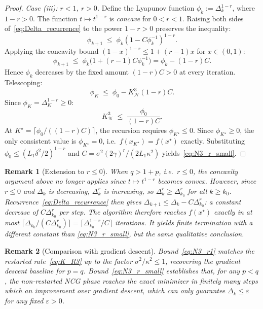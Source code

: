 \documentclass{article}
\newtheorem{remark}{Remark}
\begin{document}
\begin{proof}
\medskip
\noindent\textit{Case (iii): $r<1$, $r > 0$.}
Define the Lyapunov function $\phi_k:=\Delta_k^{1-r}$, where
$1-r>0$. The function $t\mapsto t^{1-r}$ is \emph{concave} for
$0<r<1$. Raising both sides of~\eqref{eq:Delta_recurrence} to the
power $1-r>0$ preserves the inequality:
\[
\phi_{k+1} \;\leq\; \phi_k(1-C\phi_k^{-1})^{1-r}.
\]
Applying the concavity bound $(1-x)^{1-r}\leq 1+(r-1)x$ for
$x\in(0,1)$:
\[
\phi_{k+1} \;\leq\; \phi_k\bigl(1+(r-1)C\phi_k^{-1}\bigr)
= \phi_k - (1-r)C.
\]
Hence $\phi_k$ decreases by the fixed amount $(1-r)C>0$ at every
iteration. Telescoping:
\[
\phi_K \;\leq\; \phi_0 - K^3_{\mathcal{N}}(1-r)C.
\]
Since $\phi_K=\Delta_K^{1-r}\geq 0$:
\[
K^3_{\mathcal{N}} \;\leq\; \frac{\phi_0}{(1-r)C}.
\]
At $K^\star=\lceil\phi_0/((1-r)C)\rceil$, the recursion requires
$\phi_{K^\star}\leq 0$. Since $\phi_{K^\star}\geq 0$, the only
consistent value is $\phi_{K^\star}=0$, i.e.\
$f(x_{K^\star})=f(x^\star)$ exactly.
Substituting $\phi_0\leq(L_1\delta^2/2)^{1-r}$ and
$C=\sigma^2(2\gamma)^r/(2L_1\kappa^2)$
yields~\eqref{eq:N3_r_small}.
\end{proof}

\begin{remark}[Extension to $r\leq 0$]
\label{rem:r_negative}
When $q>1+p$, i.e.\ $r\leq 0$, the concavity argument above no
longer applies since $t\mapsto t^{1-r}$ becomes convex. However,
since $r\leq 0$ and $\Delta_k$ is decreasing, $\Delta_k^r$ is
increasing, so $\Delta_k^r\geq\Delta_{k_0}^r$ for all $k\geq k_0$.
Recurrence~\eqref{eq:Delta_recurrence} then gives
$\Delta_{k+1}\leq\Delta_k - C\Delta_{k_0}^r$: a constant decrease
of $C\Delta_{k_0}^r$ per step. The algorithm therefore reaches
$f(x^\star)$ exactly in at most
$\lceil\Delta_{k_0}/(C\Delta_{k_0}^r)\rceil
=\lceil\Delta_{k_0}^{1-r}/C\rceil$
iterations. It yields finite termination with a different constant than
\eqref{eq:N3_r_small}, but the same qualitative conclusion.
\end{remark}

\begin{remark}[Comparison with gradient descent]
\label{rem:gd_comparison}
Bound~\eqref{eq:N3_r1} matches the restarted rate~\eqref{eq:K_R3}
up to the factor $\sigma^2/\kappa^2\leq 1$, recovering the gradient
descent baseline for $p=q$. Bound~\eqref{eq:N3_r_small} establishes
that, for any $p<q$, the non-restarted NCG phase reaches the
\emph{exact} minimizer in finitely many steps which an
improvement over gradient descent, which can only guarantee
$\Delta_k\leq\varepsilon$ for any fixed $\varepsilon>0$.
\end{remark}
\end{document}
